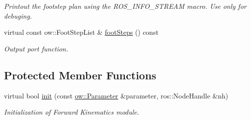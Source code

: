 \begin{DoxyCompactItemize}
\begin{DoxyCompactList}\small\item\em Printout the footstep plan using the R\+O\+S\+\_\+\+I\+N\+F\+O\+\_\+\+S\+T\+R\+E\+AM macro. Use only for debuging. \end{DoxyCompactList}\item 
virtual const ow\+::\+Foot\+Step\+List \& \hyperlink{classow__fs__planner_1_1FootstepPlanner_a645f6cda432350868a0bb9e78b435462}{foot\+Steps} () const 
\begin{DoxyCompactList}\small\item\em Output port function. \end{DoxyCompactList}\end{DoxyCompactItemize}
\subsection*{Protected Member Functions}
\begin{DoxyCompactItemize}
\item 
virtual bool \hyperlink{classow__fs__planner_1_1FootstepPlanner_ab3240b5742fb9188a5120c558db6c0bd}{init} (const \hyperlink{classow_1_1Parameter}{ow\+::\+Parameter} \&parameter, ros\+::\+Node\+Handle \&nh)
\begin{DoxyCompactList}\small\item\em Initialization of Forward Kinematics module. \end{DoxyCompactList}\end{DoxyCompactItemize}
